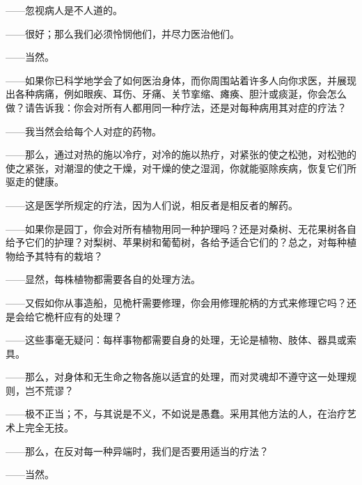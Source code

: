 ——忽视病人是不人道的。\par

——很好；那么我们必须怜悯他们，并尽力医治他们。\par

——当然。\par

——如果你已科学地学会了如何医治身体，而你周围站着许多人向你求医，并展现出各种病痛，例如眼疾、耳伤、牙痛、关节挛缩、瘫痪、胆汁或痰涎，你会怎么做？请告诉我：你会对所有人都用同一种疗法，还是对每种病用其对症的疗法？\par

——我当然会给每个人对症的药物。\par

——那么，通过对热的施以冷疗，对冷的施以热疗，对紧张的使之松弛，对松弛的使之紧张，对潮湿的使之干燥，对干燥的使之湿润，你就能驱除疾病，恢复它们所驱走的健康。\par

——这是医学所规定的疗法，因为人们说，相反者是相反者的解药。\par

——如果你是园丁，你会对所有植物用同一种护理吗？还是对桑树、无花果树各自给予它们的护理？对梨树、苹果树和葡萄树，各给予适合它们的？总之，对每种植物给予其特有的栽培？\par

——显然，每株植物都需要各自的处理方法。\par

——又假如你从事造船，见桅杆需要修理，你会用修理舵柄的方式来修理它吗？还是会给它桅杆应有的处理？\par

——这些事毫无疑问：每样事物都需要自身的处理，无论是植物、肢体、器具或索具。\par

——那么，对身体和无生命之物各施以适宜的处理，而对灵魂却不遵守这一处理规则，岂不荒谬？\par

——极不正当；不，与其说是不义，不如说是愚蠢。采用其他方法的人，在治疗艺术上完全无技。\par

——那么，在反对每一种异端时，我们是否要用适当的疗法？\par

——当然。\par

